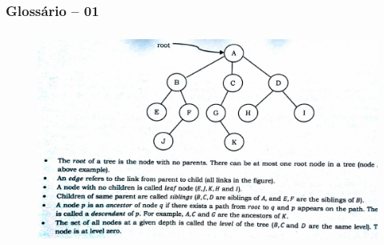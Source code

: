 \begin{frame}

    \frametitle{Glossário -- 01}
    
     \begin{figure}[!ht]
     \centering
    \includegraphics[width=12cm, height=7cm]{figs/fig_arvores/glossario_arv_01.png}
    \end{figure}

\end{frame}

